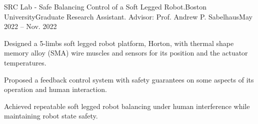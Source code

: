 \begin{rSubsection}{SRC Lab -  Safe Balancing Control of a Soft Legged Robot.}{Boston University}{Graduate Research Assistant. Advisor: Prof. Andrew P. Sabelhaus}{May 2022 -- Nov. 2022}
\item Designed a 5-limbs soft legged robot platform, Horton, with thermal shape memory alloy (SMA) wire muscles and sensors for its position and the actuator temperatures.
\item Proposed a feedback control system with safety guarantees on some aspects of its operation and human interaction.
\item Achieved repeatable soft legged robot balancing under human interference while maintaining robot state safety.
\end{rSubsection}